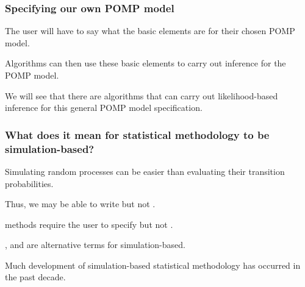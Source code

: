 \documentclass{beamer}\usepackage[]{graphicx}\usepackage[]{color}
\begin{document}
\begin{frame}[fragile]

\frametitle{Specifying our own POMP model}

\bi

\item The user will have to say what the basic elements are for their chosen POMP model.

\item Algorithms can then use these basic elements to carry out inference for the POMP model.

\item We will see that there are algorithms that can carry out likelihood-based inference for this general POMP model specification.

\ei

\end{frame}  

\begin{frame}[fragile] 

\frametitle{What does it mean for statistical methodology to be simulation-based?}

\bi

\item Simulating random processes can be easier than evaluating their transition probabilities.

\item Thus, we may be able to write  but not .

\item  {} methods require the user to specify  but not .
 
\item {},  and  are alternative terms for simulation-based.

\item Much development of simulation-based statistical methodology has occurred in the past decade.

\ei

\end{frame}    
\end{document}
